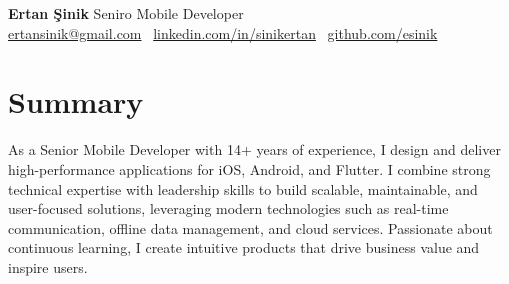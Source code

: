 \documentclass[10pt,a4paper]{extarticle}
\begin{document}
\begin{center}
    \begin{minipage}{\textwidth}
        \centering
        {\LARGE\textbf{Ertan Şinik}} \hspace{2pt} {\LARGE{Seniro Mobile Developer}}\\[10pt]
        \href{mailto:ertansinik@gmail.com}{ertansinik@gmail.com} \textbullet\
        \href{https://linkedin.com/in/sinikertan}{linkedin.com/in/sinikertan} \textbullet\
        \href{https://github.com/esinik}{github.com/esinik}
    \end{minipage}
\end{center}
\section{Summary}
As a Senior Mobile Developer with 14+ years of experience, I design and deliver high-performance applications for iOS, Android, and Flutter. I combine strong technical expertise with leadership skills to build scalable, maintainable, and user-focused solutions, leveraging modern technologies such as real-time communication, offline data management, and cloud services. Passionate about continuous learning, I create intuitive products that drive business value and inspire users.
\end{document}
